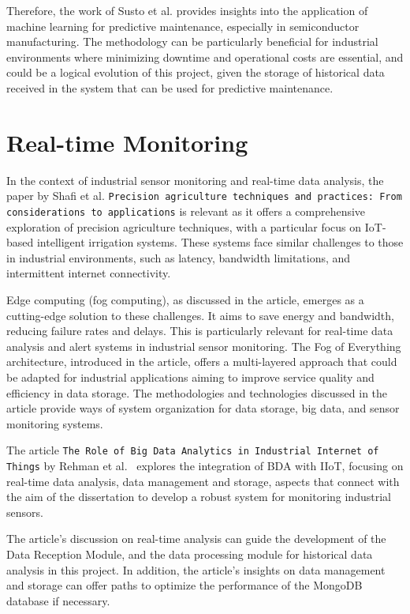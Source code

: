 Therefore, the work of Susto et al. provides insights into the application of machine learning for predictive maintenance, especially in semiconductor manufacturing. The methodology can be particularly beneficial for industrial environments where minimizing downtime and operational costs are essential, and could be a logical evolution of this project, given the storage of historical data received in the system that can be used for predictive maintenance.

\section{Real-time Monitoring}

In the context of industrial sensor monitoring and real-time data analysis, the paper by Shafi et al. \cite{shafi2019precision} \texttt{Precision agriculture techniques and practices: From considerations to applications} is relevant as it offers a comprehensive exploration of precision agriculture techniques, with a particular focus on IoT-based intelligent irrigation systems. These systems face similar challenges to those in industrial environments, such as latency, bandwidth limitations, and intermittent internet connectivity.

Edge computing (fog computing), as discussed in the article, emerges as a cutting-edge solution to these challenges. It aims to save energy and bandwidth, reducing failure rates and delays. This is particularly relevant for real-time data analysis and alert systems in industrial sensor monitoring. The Fog of Everything architecture, introduced in the article, offers a multi-layered approach that could be adapted for industrial applications aiming to improve service quality and efficiency in data storage. The methodologies and technologies discussed in the article provide ways of system organization for data storage, big data, and sensor monitoring systems.

The article \texttt{The Role of Big Data Analytics in Industrial Internet of Things} by Rehman et al.~\cite{REHMAN} explores the integration of \gls{BDA} with \gls{IIoT}, focusing on real-time data analysis, data management and storage, aspects that connect with the aim of the dissertation to develop a robust system for monitoring industrial sensors.

The article's discussion on real-time analysis can guide the development of the Data Reception Module, and the data processing module for historical data analysis in this project. In addition, the article's insights on data management and storage can offer paths to optimize the performance of the MongoDB database if necessary.

